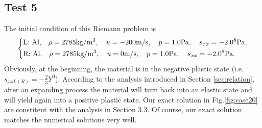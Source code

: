 \documentclass[review]{elsarticle}
\numberwithin{equation}{section}
\numberwithin{table}{section}
\begin{document}
\subsection{Test 5}
The initial condition of this Riemann problem is
\begin{equation}
 \left\{ \begin{aligned}
	 &	 \text{L: Al,}\quad  \rho = 2785 \text{kg}/\text{m}^3, \quad  u = -200\text{m}/\text{s}, \quad  p = 1.0 \text{Pa}, \quad  s_{xx}=-2.0\time 10^8 \text{Pa},\\
	 &	 \text{R: Al,}\quad  \rho = 2785 \text{kg}/\text{m}^3, \quad  u = 0\text{m}/\text{s}, \quad  p = 1.0\text{Pa}, \quad  s_{xx}= -2.0 \time 10^8 \text{Pa}.\\
   \end{aligned}
 \right.
\end{equation}
Obviously, at the beginning, the material is in the negative plastic state (i.e. $s_{xxL(R)}=-\frac{2}{3}{Y}^{0}$). According to the analysis introduced in  Section \ref{sec:relation}, after an expanding process the material will turn back into an elastic state and will yield again into a positive plastic state. Our exact solution in  Fig.\ref{fig:case20} are constitent with the analysis in Section 3.3. Of course, our exact solution matches the numerical solutions very well.
\end{document}
